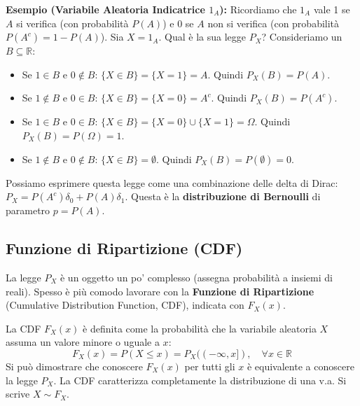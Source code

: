 \begin{example}
\textbf{Esempio (Variabile Aleatoria Indicatrice $1_A$):}
Ricordiamo che $1_A$ vale 1 se $A$ si verifica (con probabilità $P(A)$) e 0 se $A$ non si verifica (con probabilità $P(A^c) = 1-P(A)$).
Sia $X = 1_A$. Qual è la sua legge $P_X$?
Consideriamo un $B \subseteq \mathbb{R}$:
\begin{itemize}
    \item Se $1 \in B$ e $0 \notin B$: $\{X \in B\} = \{X=1\} = A$. Quindi $P_X(B) = P(A)$.
    \item Se $1 \notin B$ e $0 \in B$: $\{X \in B\} = \{X=0\} = A^c$. Quindi $P_X(B) = P(A^c)$.
    \item Se $1 \in B$ e $0 \in B$: $\{X \in B\} = \{X=0\} \cup \{X=1\} = \Omega$. Quindi $P_X(B) = P(\Omega) = 1$.
    \item Se $1 \notin B$ e $0 \notin B$: $\{X \in B\} = \emptyset$. Quindi $P_X(B) = P(\emptyset) = 0$.
\end{itemize}
Possiamo esprimere questa legge come una combinazione delle delta di Dirac:
$P_X = P(A^c) \delta_0 + P(A) \delta_1$.
Questa è la \textbf{distribuzione di Bernoulli} di parametro $p=P(A)$.
\end{example}

\subsection{Funzione di Ripartizione (CDF)}
La legge $P_X$ è un oggetto un po' complesso (assegna probabilità a insiemi di reali). Spesso è più comodo lavorare con la \textbf{Funzione di Ripartizione} (Cumulative Distribution Function, CDF), indicata con $F_X(x)$.

\begin{definition}
La CDF $F_X(x)$ è definita come la probabilità che la variabile aleatoria $X$ assuma un valore minore o uguale a $x$:
\[ F_X(x) = P(X \le x) = P_X((-\infty, x]), \quad \forall x \in \mathbb{R} \]
Si può dimostrare che conoscere $F_X(x)$ per tutti gli $x$ è equivalente a conoscere la legge $P_X$. La CDF caratterizza completamente la distribuzione di una v.a. Si scrive $X \sim F_X$.
\end{definition}

